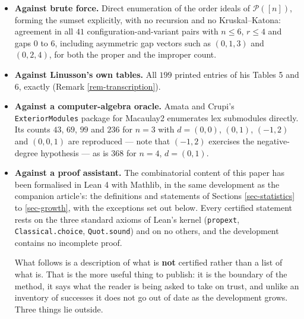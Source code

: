 \documentclass[11pt, a4paper, abstract=yes]{scrartcl}
\theoremstyle{definition}
\theoremstyle{remark}
\theoremstyle{plain}
\begin{document}
\begin{itemize}
\item \textbf{Against brute force.} Direct enumeration of the order ideals of \(\mathcal P([n])\), forming the
sumset explicitly, with no recursion and no Kruskal--Katona: agreement in all \(41\)
configuration-and-variant pairs with \(n\le6\), \(r\le4\) and gaps \(0\) to \(6\), including
asymmetric gap vectors such as \((0,1,3)\) and \((0,2,4)\), for both the proper and the improper
count.
\item \textbf{Against Linusson's own tables.} All \(199\) printed entries of his Tables 5 and 6, exactly
(Remark \ref{rem-transcription}).
\item \textbf{Against a computer-algebra oracle.} Amata and Crupi's \texttt{ExteriorModules} package \autocite{AmataCrupi2021} for Macaulay2
enumerates lex submodules directly. Its counts \(43\), \(69\), \(99\) and \(236\) for \(n=3\) with
\(d=(0,0)\), \((0,1)\), \((-1,2)\) and \((0,0,1)\) are reproduced --- note that \((-1,2)\) exercises
the negative-degree hypothesis --- as is \(368\) for \(n=4\), \(d=(0,1)\).
\item \textbf{Against a proof assistant.} The combinatorial content of this paper has been formalised in Lean 4
with Mathlib, in the same development as the companion article's: the definitions and statements of
Sections \ref{sec-statistics} to \ref{sec-growth}, with the exceptions set out below. Every certified
statement rests on the three standard axioms of Lean's kernel (\texttt{propext}, \texttt{Classical.choice},
\texttt{Quot.sound}) and on no others, and the development contains no incomplete proof.

What follows is a description of what is \textbf{not} certified rather than a list of what is. That is the
more useful thing to publish: it is the boundary of the method, it says what the reader is being
asked to take on trust, and unlike an inventory of successes it does not go out of date as the
development grows. Three things lie outside.


\end{itemize}
\end{document}
